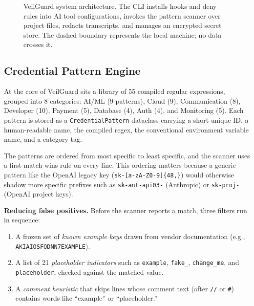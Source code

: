 \documentclass[conference]{IEEEtran}
\begin{document}
\begin{figure}[t]
\caption{VeilGuard system architecture. The CLI installs hooks and deny rules
into AI tool configurations, invokes the pattern scanner over project files,
redacts transcripts, and manages an encrypted secret store. The dashed
boundary represents the local machine; no data crosses it.}
\label{fig:arch}
\end{figure}

\subsection{Credential Pattern Engine}
\label{sec:patterns}

At the core of VeilGuard sits a library of 55 compiled regular expressions,
grouped into 8 categories: AI/ML (9 patterns), Cloud (9), Communication (8),
Developer (10), Payment (5), Database (4), Auth (4), and Monitoring (5). Each
pattern is stored as a \texttt{CredentialPattern} dataclass carrying a short
unique ID, a human-readable name, the compiled regex, the conventional
environment variable name, and a category tag.

The patterns are ordered from most specific to least specific, and the scanner
uses a first-match-wins rule on every line. This ordering matters because a
generic pattern like the OpenAI legacy key (\texttt{sk-[a-zA-Z0-9]\{48,\}})
would otherwise shadow more specific prefixes such as
\texttt{sk-ant-api03-} (Anthropic) or \texttt{sk-proj-} (OpenAI project keys).

\textbf{Reducing false positives.} Before the scanner reports a match, three
filters run in sequence:

\begin{enumerate}
  \item A frozen set of \emph{known example keys} drawn from vendor
        documentation (e.g., \texttt{AKIAIOSFODNN7EXAMPLE}).
  \item A list of 21 \emph{placeholder indicators} such as \texttt{example},
        \texttt{fake\_}, \texttt{change\_me}, and \texttt{placeholder}, checked
        against the matched value.
  \item A \emph{comment heuristic} that skips lines whose comment text
        (after \texttt{//} or \texttt{\#}) contains words like ``example'' or
        ``placeholder.''
\end{enumerate}
\end{document}
